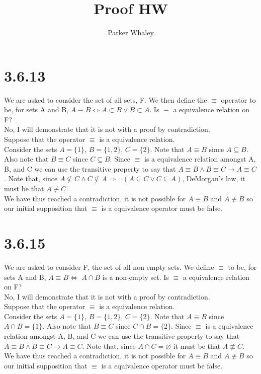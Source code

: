 \documentclass[12pt,a4paper]{article}
\author{Parker Whaley}
\title{Proof HW}
\begin{document}
\maketitle
\section{3.6.13}
We are asked to consider the set of all sets, F.  We then define the $\equiv$ operator to be, for sets A and B, $A\equiv B \Leftrightarrow A\subset B \vee B\subset A$.  Is $\equiv$ a equivalence relation on F?\\

No, I will demonstrate that it is not with a proof by contradiction.\\

Suppose that the operator $\equiv$ is a equivalence relation.\\
Consider the sets $A=\{ 1\}$,  $B=\{ 1,2\}$,  $C=\{ 2\}$.  Note that $A\equiv B$ since $A\subseteq B$.  Also note that $B\equiv C$ since $C\subseteq B$.  Since $\equiv$ is a equivalence relation amongst A, B, and C we can use the transitive property to say that $A\equiv B \wedge B\equiv C \rightarrow A\equiv C$.  Note that, since $A\nsubseteq C\wedge C\nsubseteq A\Rightarrow \neg(A\subseteq C\vee C\subseteq A)$, DeMorgan’s law, it must be that $A\not\equiv C$.\\
We have thus reached a contradiction, it is not possible for $A\equiv B$ and $A\not\equiv B$ so our initial supposition that $\equiv$ is a equivalence operator must be false.

\section{3.6.15}
We are asked to consider F, the set of all non empty sets.  We define $\equiv$ to be, for sets A and B, $A\equiv B \Leftrightarrow$ $A\cap B$ is a non-empty set.  Is $\equiv$ a equivalence relation on F?\\

No, I will demonstrate that it is not with a proof by contradiction.\\

Suppose that the operator $\equiv$ is a equivalence relation.\\
Consider the sets $A=\{ 1\}$,  $B=\{ 1,2\}$,  $C=\{ 2\}$.  Note that $A\equiv B$ since $A\cap B=\{ 1\}$.  Also note that $B\equiv C$ since $C\cap B=\{ 2\}$.  Since $\equiv$ is a equivalence relation amongst A, B, and C we can use the transitive property to say that $A\equiv B \wedge B\equiv C \rightarrow A\equiv C$.  Note that, since $A\cap C=\varnothing $ it must be that $A\not\equiv C$.\\
We have thus reached a contradiction, it is not possible for $A\equiv B$ and $A\not\equiv B$ so our initial supposition that $\equiv$ is a equivalence operator must be false.
\end{document}
